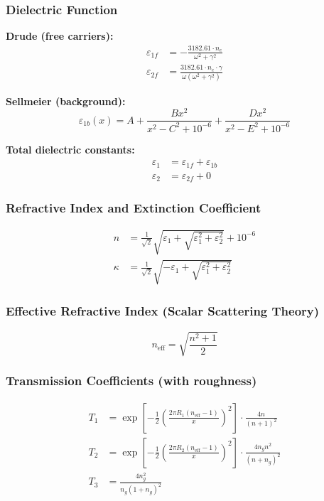 \documentclass[11pt,a4paper]{article}
\begin{document}
\subsubsection*{Dielectric Function}
\textbf{Drude (free carriers):}
\begin{align*}
    \varepsilon_{1f} &= -\frac{3182.61 \cdot n_e}{\omega^2 + \gamma^2} \\[4pt]
    \varepsilon_{2f} &= \frac{3182.61 \cdot n_e \cdot \gamma}{\omega(\omega^2 + \gamma^2)}
\end{align*}

\textbf{Sellmeier (background):}
\begin{equation*}
    \varepsilon_{1b}(x) = A + \frac{B x^2}{x^2 - C^2 + 10^{-6}} + \frac{D x^2}{x^2 - E^2 + 10^{-6}}
\end{equation*}

\textbf{Total dielectric constants:}
\begin{align*}
    \varepsilon_1 &= \varepsilon_{1f} + \varepsilon_{1b} \\
    \varepsilon_2 &= \varepsilon_{2f} + 0
\end{align*}

\subsubsection*{Refractive Index and Extinction Coefficient}
\begin{align*}
    n &= \frac{1}{\sqrt{2}} \sqrt{\varepsilon_1 + \sqrt{\varepsilon_1^2 + \varepsilon_2^2}} + 10^{-6} \\[4pt]
    \kappa &= \frac{1}{\sqrt{2}} \sqrt{-\varepsilon_1 + \sqrt{\varepsilon_1^2 + \varepsilon_2^2}}
\end{align*}

\subsubsection*{Effective Refractive Index (Scalar Scattering Theory)}
\begin{equation*}
    n_{\text{eff}} = \sqrt{\frac{n^2 + 1}{2}}
\end{equation*}

\subsubsection*{Transmission Coefficients (with roughness)}
\begin{align*}
    T_1 &= \exp\!\left[-\frac{1}{2}\left(\frac{2\pi R_1 (n_{\text{eff}} - 1)}{x}\right)^2\right] \cdot \frac{4n}{(n+1)^2} \\[4pt]
    T_2 &= \exp\!\left[-\frac{1}{2}\left(\frac{2\pi R_2 (n_{\text{eff}} - 1)}{x}\right)^2\right] \cdot \frac{4n_g n^2}{(n+n_g)^2} \\[4pt]
    T_3 &= \frac{4n_g^2}{n_g(1+n_g)^2}
\end{align*}
\end{document}
